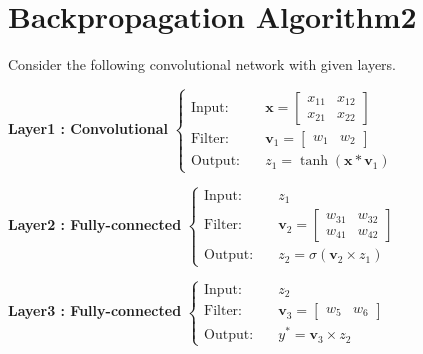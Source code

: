 \section{Backpropagation Algorithm2}

Consider the following convolutional network with given layers.

\textbf{Layer1 : Convolutional}
$
\left\{
\begin{aligned}
\text{Input} : & \quad \mathbf{x} = \begin{bmatrix}
x_{11} & x_{12} \\
x_{21} & x_{22}
\end{bmatrix} \\
\text{Filter} : & \quad \mathbf{v}_1 = \begin{bmatrix}
w_1 & w_2
\end{bmatrix} \\
\text{Output} : & \quad z_1 = \tanh(\mathbf{x} * \mathbf{v}_1)
\end{aligned}
\right.
$

\textbf{Layer2 : Fully-connected}
$
\left\{
\begin{aligned}
\text{Input} : & \quad z_1 \\
\text{Filter} : & \quad \mathbf{v}_2 = \begin{bmatrix}
w_{31} & w_{32} \\
w_{41} & w_{42}
\end{bmatrix} \\
\text{Output} : & \quad z_2 = \sigma(\mathbf{v}_2 \times z_1)
\end{aligned}
\right.
$

\textbf{Layer3 : Fully-connected}
$
\left\{
\begin{aligned}
\text{Input} : & \quad z_2 \\
\text{Filter} : & \quad \mathbf{v}_3 = \begin{bmatrix}
w_5 & w_6
\end{bmatrix} \\
\text{Output} : & \quad y^* = \mathbf{v}_3 \times z_2
\end{aligned}
\right.
$


